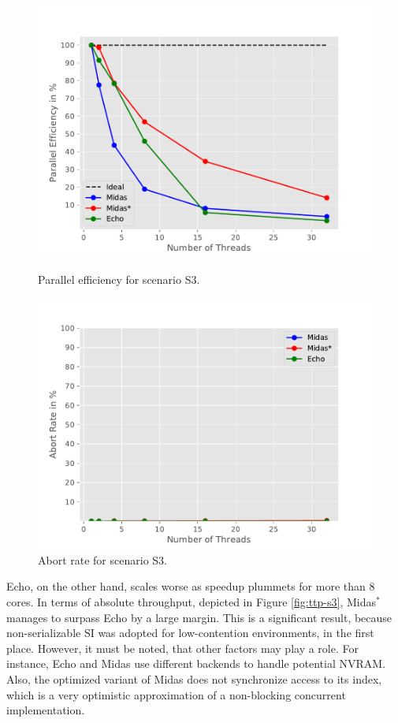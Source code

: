 \begin{figure}[h!]
\begin{minipage}[l]{0.50\textwidth}
    \includegraphics[width=\textwidth]{figures/bench/eff-ls}
    \caption{Parallel efficiency for scenario S3.}
    \label{fig:eff-s3}
\end{minipage}
\begin{minipage}[l]{0.50\textwidth}
    \includegraphics[width=\textwidth]{figures/bench/ar-ls}
    \caption{Abort rate for scenario S3.}
    \label{fig:ar-s3}
\end{minipage}
\end{figure}

Echo, on the other hand, scales worse as speedup plummets for more than 8 cores.
In terms of absolute throughput, depicted in Figure \ref{fig:ttp-s3},
Midas$^{*}$ manages to surpass Echo by a large margin. This is a significant
result, because non-serializable SI was adopted for low-contention environments,
in the first place. However, it must be noted, that other factors may play a
role. For instance, Echo and Midas use different backends to handle potential
NVRAM. Also, the optimized variant of Midas does not synchronize access to its
index, which is a very optimistic approximation of a non-blocking concurrent
implementation.

